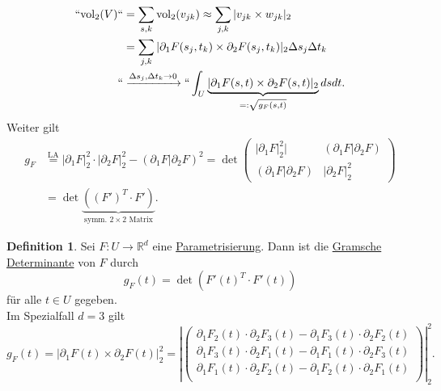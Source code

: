 \documentclass[a4paper]{scrreprt}
\newcommand{\R}{\mathbb{R}}
\newcommand{\jlabel}[1]{\label{j_#1}}
\newcommand{\jterm}[1]{\jlabel{#1}\uline{#1}}
\newcommand{\jhyperref}[2]{\hyperref[j_#1]{#2}}
\newcommand{\jlink}[1]{\jhyperref{#1}{#1}}
\newcommand{\jabb}[3]{ #1: #2 \rightarrow #3 }
\theoremstyle{plain}
\theoremstyle{definition}
\newtheorem{defn}[thm]{Definition}
\begin{document}
{{{{\[
    \begin{split}
        ``\text{vol}_2(V)`` &= \sum_{s,k} \text{vol}_2 (v_{jk}) \approx \sum_{j,k} |v_{jk} \times w_{jk}|_2\\
                            &= \sum_{j,k} |\partial_1 F(s_j,t_k) \times \partial_2 F(s_j,t_k)|_2 \Delta s_j \Delta t_k\\
                            ``&\xrightarrow{\Delta s_j, \Delta t_k \rightarrow 0}`` \int_U \underbrace{|\partial_1 F(s,t) \times \partial_2 F(s,t) |_2}_{=: \sqrt{g_F(s,t)}} ds dt.
    \end{split}
\]
Weiter gilt
\[
    \begin{split}
        g_F &\overset{\text{LA}}{=} |\partial_1 F|_2^2 \cdot |\partial_2 F|_2^2 - (\partial_1 F| \partial_2 F)^2 = \det \begin{pmatrix}
                                                                                                                           |\partial_1 F|_2^2| & (\partial_1 F| \partial_2 F) \\
                                                                                                                           (\partial_1 F| \partial_2 F) & |\partial_2 F|_2^2
                                                                                                                         \end{pmatrix}\\
            &=\det \underbrace{\left((F')^T \cdot F'\right)}_{\text{symm. } 2\times 2 \text{ Matrix}}.
    \end{split}                                                                                                                        
\]

\begin{defn}
    \jlabel{Def 4.8}
    Sei $\jabb{F}{U}{\R^d}$ eine \jlink{Parametrisierung}. Dann ist die \jterm{Gramsche Determinante} von $F$ durch
    \[
        g_F(t) = \det \left( F'(t)^T \cdot F'(t) \right)
    \]
    für alle $t\in U$ gegeben.\\
    Im Spezialfall $d=3$ gilt
    \[
        g_F(t) = |\partial_1 F(t) \times \partial_2 F(t)|_2^2 = \left|\begin{pmatrix}
                                                                        \partial_1 F_2(t)\cdot \partial_2 F_3(t) - \partial_1 F_3(t)\cdot \partial_2 F_2(t) \\
                                                                        \partial_1 F_3(t)\cdot \partial_2 F_1(t) - \partial_1 F_1(t)\cdot \partial_2 F_3(t) \\
                                                                        \partial_1 F_1(t)\cdot \partial_2 F_2(t) - \partial_1 F_2(t)\cdot \partial_2 F_1(t) \\
                                                                     \end{pmatrix} \right |_2^2.
    \]
\end{defn}

}}}}
\end{document}

